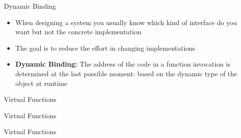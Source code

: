 \begin{frame}{Dynamic Binding}
    \begin{itemize}
        \item When designing a system you usually know which kind of interface
            do you want but not the concrete implementation

        \vspace{5mm}

        \item The goal is to reduce the effort in changing implementations

        \vspace{5mm}

        \item \textbf{Dynamic Binding:} The address of the code in a function
            invocation is determined at the last possible moment: based 
            on the dynamic type of the object at runtime
    \end{itemize}
\end{frame}

\begin{frame}{Virtual Functions}
    \begin{center}
    \end{center}
\end{frame}

\begin{frame}{Virtual Functions}
    \begin{center}
    \end{center}
\end{frame}

\begin{frame}{Virtual Functions}
    \begin{center}
    \end{center}
\end{frame}

